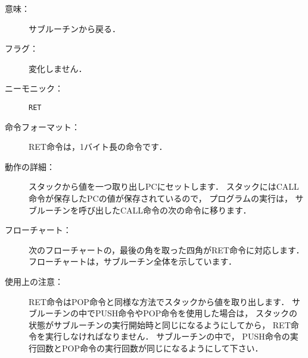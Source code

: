 \begin{description}
\item[意味：] サブルーチンから戻る．

\item[フラグ：] 変化しません．

\item[ニーモニック：] {\tt RET}

\item[命令フォーマット：] RET命令は，1バイト長の命令です．


\item[動作の詳細：]
スタックから値を一つ取り出しPCにセットします．
スタックにはCALL命令が保存したPCの値が保存されているので，
プログラムの実行は，
サブルーチンを呼び出したCALL命令の次の命令に移ります．

\item[フローチャート：]
次のフローチャートの，最後の角を取った四角がRET命令に対応します．
フローチャートは，サブルーチン全体を示しています．

\begin{center}
\end{center}

\item[使用上の注意：]
RET命令はPOP命令と同様な方法でスタックから値を取り出します．
サブルーチンの中でPUSH命令やPOP命令を使用した場合は，
スタックの状態がサブルーチンの実行開始時と同じになるようにしてから，
RET命令を実行しなければなりません．
サブルーチンの中で，
PUSH命令の実行回数とPOP命令の実行回数が同じになるようにして下さい．

\end{description}

